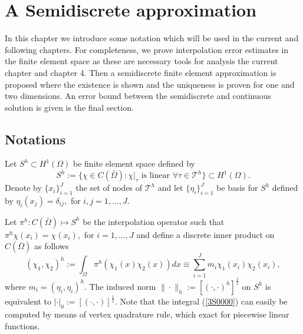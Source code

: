 \chapter{A Semidiscrete approximation}
In this chapter  we introduce some notation which will be used in the
current and 
following  chapters. For completeness, we prove interpolation error estimates in the finite
element space as these are necessary tools for analysis  the current chapter and chapter 4.  Then  a semidiscrete finite element approximation is proposed
where the existence is shown and the uniqueness is proven for one and
two dimensions. An error bound between the semidiscrete and continuous
solution is given is the final section.

\setcounter{equation}{0}
\section{Notations}
Let $S^h \subset H^1(\Omega)$ be finite element space defined by
\[S^h:=\{\chi \in C(\bar \Omega): \chi|_\tau \mbox{ is linear }
\forall \tau \in \mathcal{T}^h\} \subset H^1(\Omega).\]
Denote by $\{x_i\}_{i=1}^{J}$ the set of nodes of $ \mathcal{T}^h$
and let $ \{\eta_i\}_{i=1}^{J}$ be basis for $S^h$ defined by
$\eta_i(x_j)=\delta_{ij},$ for $i,j=1, \dots ,J$.

Let $\pi^h: C(\bar \Omega)\mapsto S^h $ be the interpolation
operator such that  $\pi^h\chi(x_i)=\chi(x_i),$ for $i=1, \dots , J$
and define a discrete inner product on $C(\bar \Omega)$ as follows
\begin{equation}
(\chi_1,\chi_2)^h:=\int_{\Omega}\pi^h(\chi_1(x)\chi_2(x))dx \equiv
\sum_{i=1}^{J}m_i\chi_1(x_i)\chi_2(x_i),\label{3S0000}
\end{equation}
where $m_i=(\eta_i,\eta_i)^h$. The induced norm
$\|\cdot\|_h:=[(\cdot,\cdot)^h]^{\frac{1}{2}}$ on $S^h$ is equivalent to
$|\cdot|_0:=[(\cdot,\cdot)]^{\frac{1}{2}}$.  Note that the integral
(\ref{3S0000}) can easily be computed by means of vertex quadrature
rule, which exact for piecewise linear functions.

